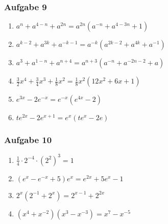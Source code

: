 \subsubsection{Aufgabe 9} 
\begin{enumerate}
	\item \quad $ a^n+a^{4-n}+a^{2n} = a^{2n}(a^{-n}+a^{4-3n}+1) $				%
	\item \quad $ a^{k-2}+a^{3k}+a^{-k-1} = a^{-k}(a^{2k-2}+a^{4k} +a^{-1}) $	%
	\item \quad $ a^3 + a^{1-n} + a^{n+4} = a^{n+3}(a^{-n}+a^{-2n-2}+a) $			%
	\item \quad $ \frac{3}{2}x^4+\frac{3}{4}x^3+\frac{1}{8}x^2 = \frac{1}{8}x^2(12x^2+6x+1) $			%
	\item \quad $ e^{3x}-2e^{-x} = e^{-x}(e^{4x}-2) $								%
	\item \quad $ te^{2x}-2e^{x+1} = e^x(te^x-2e) $										%
\end{enumerate}

\subsubsection{Aufgabe 10}
\begin{enumerate}
	\item \quad $ \frac{1}{4} \cdot 2^{-4} \cdot (2^2)^3 = 1 $									%
	\item \quad $ (e^x - e^{-x} + 5)e^x=e^{2x}+5e^x-1 $			%
	\item \quad $ 2^x(2^{-1}+2^x)=2^{x-1}+2^{2x} $		%
	\item \quad $ (x^4+x^{-2})(x^3-x^{-3})=x^7-x^{-5} $				%
\end{enumerate}

